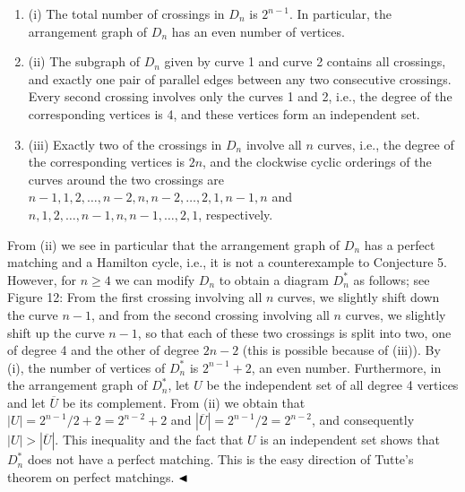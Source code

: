\documentclass[10pt,a4paper]{article}
\begin{document}
\begin{enumerate}
\item[]  (i) 
The total number of crossings in $D_{n}$ is $2^{n-1}$. In particular, the arrangement graph of $D_{n}$ has an even number of vertices.
\par
\par
\item[]  (ii) 
The subgraph of $D_{n}$ given by curve 1 and curve 2 contains all crossings, and exactly one pair of parallel edges between any two consecutive crossings. Every second crossing involves only the curves 1 and 2, i.e., the degree of the corresponding vertices is 4, and these vertices form an independent set.
\par
\par
\item[]  (iii) 
Exactly two of the crossings in $D_{n}$ involve all $n$ curves, i.e., the degree of the corresponding vertices is $2n$, and the clockwise cyclic orderings of the curves around the two crossings are $n-1,1,2,\ldots,n-2,n,n-2,\ldots,2,1,n-1,n$ and $n,1,2,\ldots,n-1,n,n-1,\ldots,2,1$, respectively.
\par
\par
\end{enumerate}
From (ii) we see in particular that the arrangement graph of $D_{n}$ has a perfect matching and a Hamilton cycle, i.e., it is not a counterexample to Conjecture 5. However, for $n\geq 4$ we can modify $D_{n}$ to obtain a diagram $D_{n}^{*}$ as follows; see Figure 12: From the first crossing involving all $n$ curves, we slightly shift down the curve $n-1$, and from the second crossing involving all $n$ curves, we slightly shift up the curve $n-1$, so that each of these two crossings is split into two, one of degree 4 and the other of degree $2n-2$ (this is possible because of (iii)). By (i), the number of vertices of $D_{n}^{*}$ is $2^{n-1}+2$, an even number. Furthermore, in the arrangement graph of $D_{n}^{*}$, let $U$ be the independent set of all degree 4 vertices and let $\overline{U}$ be its complement. From (ii) we obtain that $|U|=2^{n-1}/2+2=2^{n-2}+2$ and $|\overline{U}|=2^{n-1}/2=2^{n-2}$, and consequently $|U|>|\overline{U}|$. This inequality and the fact that $U$ is an independent set shows that $D_{n}^{*}$ does not have a perfect matching. This is the easy direction of Tutte’s theorem on perfect matchings. $\hfill\blacktriangleleft$
\par
\par
\end{document}
